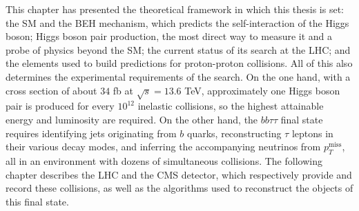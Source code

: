 \noindent This chapter has presented the theoretical framework in which this thesis is set: the SM and the BEH mechanism, which predicts the self-interaction of the Higgs boson; Higgs boson pair production, the most direct way to measure it and a probe of physics beyond the SM; the current status of its search at the LHC; and the elements used to build predictions for proton-proton collisions. All of this also determines the experimental requirements of the search. On the one hand, with a cross section of about $34$ fb at $\sqrt{s}=13.6$ TeV, approximately one Higgs boson pair is produced for every $10^{12}$ inelastic collisions, so the highest attainable energy and luminosity are required. On the other hand, the $bb\tau\tau$ final state requires identifying jets originating from $b$ quarks, reconstructing $\tau$ leptons in their various decay modes, and inferring the accompanying neutrinos from $p_T^\text{miss}$, all in an environment with dozens of simultaneous collisions. The following chapter describes the LHC and the CMS detector, which respectively provide and record these collisions, as well as the algorithms used to reconstruct the objects of this final state.






